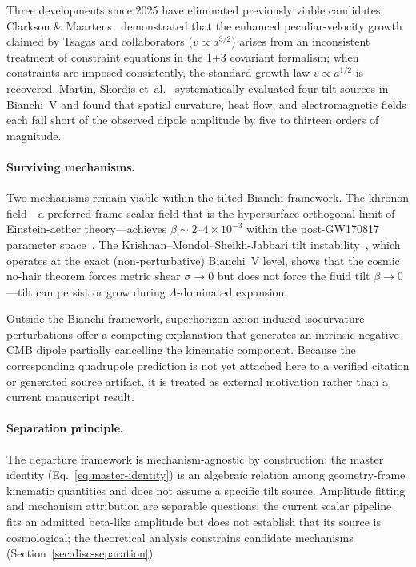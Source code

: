 Three developments since 2025 have eliminated previously
viable candidates.
Clarkson \& Maartens~\cite{ClarksonMaartens2026}
demonstrated that the enhanced peculiar-velocity growth
claimed by Tsagas and collaborators ($v \propto a^{3/2}$)
arises from an inconsistent treatment of constraint
equations in the 1+3 covariant formalism; when constraints
are imposed consistently, the standard growth law
$v \propto a^{1/2}$ is recovered.
Mart{\'i}n, Skordis et~al.~\cite{MartinSkordis2025}
systematically evaluated four tilt sources in Bianchi~V and
found that spatial curvature, heat flow, and electromagnetic
fields each fall short of the observed dipole amplitude by
five to thirteen orders of magnitude.


\paragraph{Surviving mechanisms.}

Two mechanisms remain viable within the tilted-Bianchi
framework.  The khronon field---a preferred-frame scalar
field that is the hypersurface-orthogonal limit of
Einstein-aether theory---achieves
$\beta \sim 2$--$4 \times 10^{-3}$ within the
post-GW170817 parameter
space~\cite{MartinSkordis2025}.
The Krishnan--Mondol--Sheikh-Jabbari tilt
instability~\cite{Krishnan2023}, which operates at the exact
(non-perturbative) Bianchi~V level, shows that the cosmic
no-hair theorem forces metric shear $\sigma \to 0$ but does
not force the fluid tilt $\beta \to 0$---tilt can persist
or grow during $\Lambda$-dominated expansion.

Outside the Bianchi framework, superhorizon axion-induced
isocurvature perturbations offer a competing
explanation that generates an intrinsic negative CMB dipole
partially cancelling the kinematic component.  Because the
corresponding quadrupole prediction is not yet attached here to
a verified citation or generated source artifact, it is treated
as external motivation rather than a current manuscript result.


\paragraph{Separation principle.}

The departure framework is mechanism-agnostic by construction:
the master identity (Eq.~\ref{eq:master-identity}) is an
algebraic relation among geometry-frame kinematic quantities
and does not assume a specific tilt source.  Amplitude fitting
and mechanism attribution are separable questions: the current
scalar pipeline fits an admitted beta-like amplitude but does
not establish that its source is cosmological; the theoretical
analysis constrains candidate mechanisms
(Section~\ref{sec:disc-separation}).



